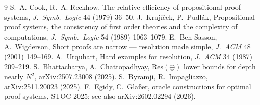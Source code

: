 \documentclass[11pt]{article}
\begin{document}
\begin{thebibliography}{9}
 S.~A. Cook, R.~A. Reckhow, The relative efficiency of
propositional proof systems, \emph{J.\ Symb.\ Logic} 44 (1979) 36--50.
 J.~Krajíček, P.~Pudlák, Propositional proof systems, the
consistency of first order theories and the complexity of computations,
\emph{J.\ Symb.\ Logic} 54 (1989) 1063--1079.
 E.~Ben-Sasson, A.~Wigderson, Short proofs are narrow ---
resolution made simple, \emph{J.\ ACM} 48 (2001) 149--169.
 A.~Urquhart, Hard examples for resolution,
\emph{J.\ ACM} 34 (1987) 209--219.
 S.~Bhattacharya, A.~Chattopadhyay, Res$(\oplus)$ lower bounds
for depth nearly $N^2$, arXiv:2507.23008 (2025).
 S.~Byramji, R.~Impagliazzo, arXiv:2511.20023 (2025).
 F.~Egidy, C.~Glaßer, oracle constructions for optimal proof
systems, STOC 2025; see also arXiv:2602.02294 (2026).
\end{thebibliography}
\end{document}

